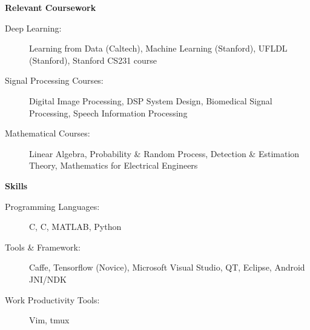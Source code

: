 \documentclass[letterpaper,11pt]{article}
\def\CC{{C\nolinebreak[4]\hspace{-.05em}\raisebox{.4ex}{\tiny\bf ++}}}
\newcommand{\resheading}[1]{{\large \colorbox{mygrey}{\begin{minipage}{\textwidth}{\textbf{#1 \vphantom{p\^{E}}}}\end{minipage}}}}
\begin{document}
\resheading{Relevant Coursework}
\begin{description}
	\item[Deep Learning:]
		Learning from Data (Caltech), Machine Learning (Stanford), UFLDL (Stanford), Stanford CS231 course
	\item[Signal Processing Courses:]
		Digital Image Processing, DSP System Design, Biomedical Signal Processing, Speech Information Processing
	\item[Mathematical Courses:]
		Linear Algebra, Probability \& Random Process, Detection \& Estimation Theory, Mathematics for Electrical Engineers
\end{description}

\resheading{Skills}
\begin{description}
	\item[Programming Languages:]
		C, \CC, MATLAB, Python
	\item[Tools \& Framework:]
		Caffe, Tensorflow (Novice), Microsoft Visual Studio, QT, Eclipse, Android JNI/NDK
	\item[Work Productivity Tools:] Vim, tmux
\end{description}
\end{document}
